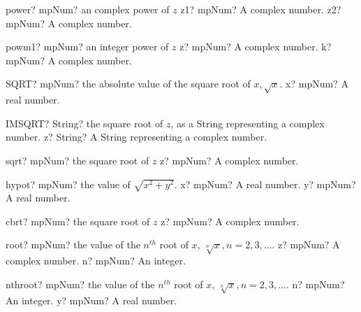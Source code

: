 \documentclass[12pt,a4paper,openany]{book}
\begin{document}
\begin{mpFunctionsExtract}
\mpFunctionTwo
{power? mpNum? an complex power of $z$}
{z1? mpNum? A complex number.}
{z2? mpNum? A complex number.}
\end{mpFunctionsExtract}

\begin{mpFunctionsExtract}
\mpFunctionTwo
{powm1? mpNum? an integer power of $z$}
{z? mpNum? A complex number.}
{k? mpNum?  A complex number.}
\end{mpFunctionsExtract}

\begin{mpFunctionsExtract}
\mpWorksheetFunctionOneNotImplemented
{SQRT? mpNum? the absolute value of the square root of $x, \sqrt{x}$.}
{x? mpNum? A real number.}
\end{mpFunctionsExtract}

\begin{mpFunctionsExtract}
\mpWorksheetFunctionOneNotImplemented
{IMSQRT? String? the square root of $z$, as a String representing a complex number.}
{z? String? A String representing a complex number.}
\end{mpFunctionsExtract}

\begin{mpFunctionsExtract}
\mpFunctionOne
{sqrt? mpNum? the square root of $z$}
{z? mpNum? A complex number.}
\end{mpFunctionsExtract}

\begin{mpFunctionsExtract}
\mpFunctionTwo
{hypot? mpNum? the value of $\sqrt{x^2+y^2}$.}
{x? mpNum? A real number.}
{y? mpNum? A real number.}
\end{mpFunctionsExtract}

\begin{mpFunctionsExtract}
\mpFunctionOne
{cbrt? mpNum? the square root of $z$}
{z? mpNum? A complex number.}
\end{mpFunctionsExtract}

\begin{mpFunctionsExtract}
\mpFunctionTwo
{root? mpNum? the value of the $n^{th}$ root of $x$, $\sqrt[n]{x}, n=2,3,...$.}
{z? mpNum? A complex number.}
{n? mpNum? An integer.}
\end{mpFunctionsExtract}

\begin{mpFunctionsExtract}
\mpFunctionTwo
{nthroot? mpNum? the value of the $n^{th}$ root of $x$, $\sqrt[n]{x}, n=2,3,...$.}
{n? mpNum? An integer.}
{y? mpNum? A real number.}
\end{mpFunctionsExtract}
\end{document}
